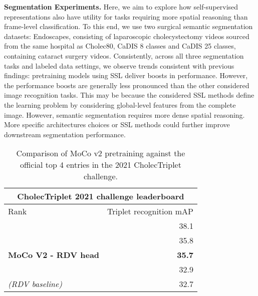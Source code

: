 \documentclass[times,twocolumn,final]{elsarticle}
\begin{document}
{\textbf{Segmentation Experiments. } Here, we aim to explore how self-supervised representations also have utility for tasks requiring more spatial reasoning than frame-level classification. To this end, we use two surgical semantic segmentation datasets: Endoscapes, consisting of laparoscopic cholecystectomy videos sourced from the same hospital as Cholec80, CaDIS 8 classes and CaDIS 25 classes, containing cataract surgery videos. Consistently, across all three segmentation tasks and labeled data settings, we observe trends consistent with previous findings:  pretraining models using SSL deliver boosts in performance. However, the performance boosts are generally less pronounced than the other considered image recognition tasks. This may be because the considered SSL methods define the learning problem by considering global-level features from the complete image. However, semantic segmentation requires more dense spatial reasoning. More specific architectures choices \citep{caron2021emerging} or SSL methods \citep{wang2021dense, xie2022simmim} could further improve downstream segmentation performance.



}


\begin{table}[]
  \centering
  \begin{tabular}{lr}
  \hline
  \multicolumn{2}{c}{\textbf{CholecTriplet 2021 challenge leaderboard}} \\ \hline
  Rank & Triplet recognition mAP \\ \hline
      & 38.1                        \\
      & 35.8                        \\
  \rowcolor{pink} \textbf{MoCo V2 - RDV head}    &  \textbf{35.7}           \\
      &  32.9                       \\
   \textit{(RDV baseline)} & 32.7                \\ \hline
  \end{tabular}
  \caption{{\color{newtext} Comparison of MoCo v2 pretraining against the official top 4 entries in the 2021 CholecTriplet challenge.}}

\label{tab:cholectriplet_leaderboard}
\end{table}
\end{document}
